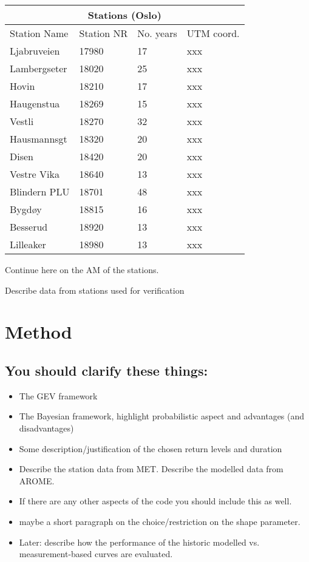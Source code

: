\documentclass[12pt]{article}
\begin{document}
{
\begin{tabular}{ |p{3cm}||p{3cm}||p{3cm}||p{3cm}|  }
 \hline
 \multicolumn{4}{|c|}{\textbf{Stations (Oslo)}} \\
 \hline
 Station Name & Station NR & No. years & UTM coord.\\
 \hline
 Ljabruveien   & 17980  & 17 &   xxx\\
 Lambergseter & 18020 & 25 & xxx\\
 Hovin & 18210 & 17 & xxx\\
 Haugenstua & 18269 & 15 & xxx\\
 Vestli & 18270 & 32 & xxx\\
 Hausmannsgt & 18320 & 20 & xxx\\
 Disen & 18420 & 20 & xxx\\
 Vestre Vika & 18640 & 13 & xxx\\
 Blindern PLU & 18701 & 48 & xxx\\
 Bygdøy & 18815 & 16 & xxx\\
 Besserud & 18920 & 13 & xxx\\
 Lilleaker & 18980 & 13 & xxx\\
 
 \hline
\end{tabular}

Continue here on the AM of the stations.

Describe data from stations used for verification 


\section{Method}
\subsection{You should clarify these things:}

\begin{itemize}
\item The GEV framework 
\item The Bayesian framework, highlight probabilistic aspect and advantages (and disadvantages)
\item Some description/justification of the chosen return levels and duration
\item Describe the station data from MET. Describe the modelled data from AROME. 
\item If there are any other aspects of the code you should include this as well.
\item maybe a short paragraph on the choice/restriction on the shape parameter. 
\item Later: describe how the performance of the historic modelled vs. measurement-based curves are evaluated. 
\end{itemize}

}
\end{document}
